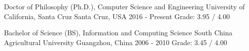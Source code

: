 

\begin{cventries}

  \cventry
    {Doctor of Philosophy (Ph.D.), Computer Science and Engineering} %
    {University of California, Santa Cruz} %
    {Santa Cruz, USA} %
    {2016 - Present} %
    {Grade: 3.95 / 4.00}

  \cventry
    {Bachelor of Science (BS), Information and Computing Science}
    {South China Agricultural University}
    {Guangzhou, China}
    {2006 - 2010}
    {Grade: 3.45 / 4.00}

\end{cventries}
